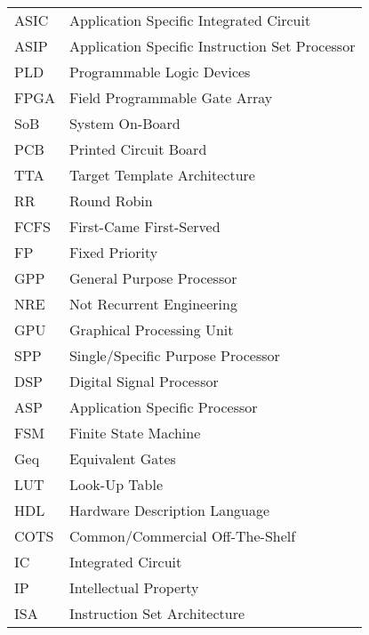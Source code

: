 \begin{center}
\begin{longtable}{ll}
	ASIC                                    & Application Specific Integrated Circuit \\
	ASIP                                    & Application Specific Instruction Set Processor \\
	PLD                                     & Programmable Logic Devices \\
	FPGA                                    & Field Programmable Gate Array  \\
   SoB                                     & System On-Board \\
	PCB                                     & Printed Circuit Board  \\
	TTA                                     & Target Template Architecture \\
	RR                                      & Round Robin  \\
	FCFS                                    & First-Came First-Served \\
	FP                                      & Fixed Priority  \\
	GPP                                     & General Purpose Processor \\
	NRE                                     & Not Recurrent Engineering \\
   GPU                                     & Graphical Processing Unit \\
   SPP                                     & Single/Specific Purpose Processor \\
	DSP                                     & Digital Signal Processor \\
	ASP                                     & Application Specific Processor \\
	FSM                                     & Finite State Machine \\
	Geq                                     & Equivalent Gates \\
    LUT                                     & Look-Up Table \\
    HDL                                     & Hardware Description Language \\
    COTS                                    & Common/Commercial Off-The-Shelf \\
    IC                                      & Integrated Circuit \\
    IP                                      & Intellectual Property \\
    ISA                                     & Instruction Set Architecture \\

\end{longtable}
\end{center}
